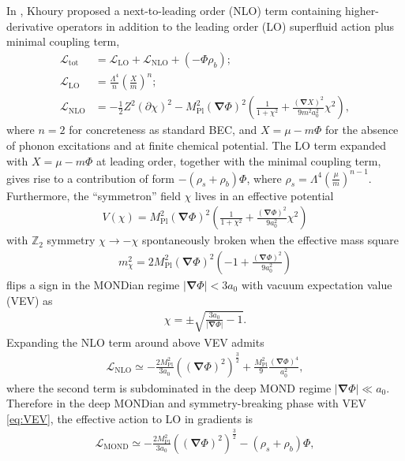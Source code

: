 \documentclass[aps,prd,twocolumn,10pt,groupedaddress]{revtex4-1}
\begin{document}
In \cite{Khoury:2016ehj}, Khoury proposed a next-to-leading order (NLO) term containing higher-derivative operators in addition to the leading order (LO) superfluid action plus minimal coupling term,
\begin{align}
\mathcal{L}_\mathrm{tot}&=\mathcal{L}_\mathrm{LO}+\mathcal{L}_\mathrm{NLO}+(-\Phi\rho_b);\\
\mathcal{L}_\mathrm{LO}&=\frac{\Lambda^4}{n}\left(\frac{X}{m}\right)^n;\\
\mathcal{L}_\mathrm{NLO}&=-\frac12Z^2(\partial\chi)^2
-M_\mathrm{Pl}^2(\mathbf{\nabla}\Phi)^2\left(\frac{1}{1+\chi^2}+\frac{(\mathbf{\nabla}X)^2}{9m^2a_0^2}\chi^2\right),
\end{align}
where $n=2$ for concreteness as standard BEC, and $X=\mu-m\Phi$ for the absence of phonon excitations and at finite chemical potential. The LO term expanded with $X=\mu-m\Phi$ at leading order, together with the minimal coupling term, gives rise to a contribution of form $-(\rho_s+\rho_b)\Phi$, where $\rho_s=\Lambda^4\left(\frac{\mu}{m}\right)^{n-1}$. Furthermore, the  ``symmetron'' field $\chi$ lives in an effective potential
\begin{align}
V(\chi)=M_\mathrm{Pl}^2(\mathbf{\nabla}\Phi)^2\left(\frac{1}{1+\chi^2}+\frac{(\mathbf{\nabla}\Phi)^2}{9a_0^2}\chi^2\right)
\end{align}
with $\mathbb{Z}_2$ symmetry $\chi\rightarrow-\chi$ spontaneously broken when the effective mass square
\begin{align}
m_\chi^2=2M_\mathrm{Pl}^2(\mathbf{\nabla}\Phi)^2\left(-1+\frac{(\mathbf{\nabla}\Phi)^2}{9a_0^2}\right)
\end{align}
flips a sign in the MONDian regime $|\mathbf{\nabla}\Phi|<3a_0$ with vacuum expectation value (VEV) as
\begin{align}\label{eq:VEV}
\chi=\pm\sqrt{\frac{3a_0}{|\mathbf{\nabla}\Phi|}-1}.
\end{align}
Expanding the NLO term around above VEV admits
\begin{align}
\mathcal{L}_\mathrm{NLO}\simeq-\frac{2M_\mathrm{Pl}^2}{3a_0}\left((\mathbf{\nabla}\Phi)^2\right)^\frac32
+\frac{M_\mathrm{Pl}^2}{9}\frac{(\mathbf{\nabla}\Phi)^4}{a_0^2},
\end{align}
where the second term is subdominated in the deep MOND regime $|\mathbf{\nabla}\Phi|\ll a_0$. Therefore in the deep MONDian and symmetry-breaking phase with VEV \eqref{eq:VEV}, the effective action to LO in gradients is
\begin{align}
\mathcal{L}_\mathrm{MOND}\simeq-\frac{2M_\mathrm{Pl}^2}{3a_0}\left((\mathbf{\nabla}\Phi)^2\right)^\frac32-(\rho_s+\rho_b)\Phi,
\end{align}
\end{document}
